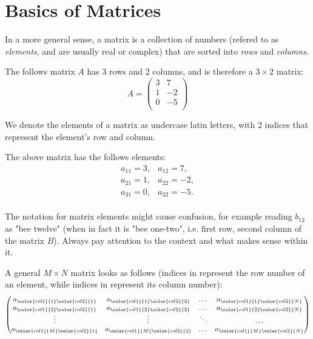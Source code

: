 \section{Basics of Matrices}
In a more general sense, a matrix is a collection of numbers (refered to as \emph{elements}, and are usually real or complex) that are sorted into \emph{rows} and \emph{columns}.
\begin{example}
  
  The follows matrix $A$ has 3 rows and 2 columns, and is therefore a $3\times2$ matrix:
  \begin{equation*}A=
	\begin{pmatrix}
	  3 & 7\\
	  1 & -2\\
	  0 & -5\\
	  \end{pmatrix}
  \end{equation*}
\end{example}

We denote the elements of a matrix as undercase latin letters, with 2 indices that represent the element's row and column.
\begin{example}
  
  The above matrix has the follows elements:
  \begin{equation*}
	\begin{array}{cc}
	  a_{11}=3, & a_{12}=7,\\
	  a_{21}=1, & a_{22}=-2,\\
	  a_{31}=0, & a_{32}=-5.\\
	\end{array}
  \end{equation*}
\end{example}

\begin{warning}
  The notation for matrix elements might cause confusion, for example reading $b_{12}$ as "bee twelve" (when in fact it is "bee one-two", i.e. first row, second column of the matrix $B$). Always pay attention to the context and what makes sense within it.
\end{warning}

A general $M\times N$ matrix looks as follows (indices in \color{col1}{red} \color{black} represent the row number of an element, while indices in \color{col2}{blue} \color{black} represent its column number):
\begin{equation*}
  \begin{pmatrix}
	a_{\color{col1}{1}\color{col2}{1}} & a_{\color{col1}{1}\color{col2}{2}} & \dots & a_{\color{col1}{1}\color{col2}{N}}\\
	a_{\color{col1}{2}\color{col2}{1}} & a_{\color{col1}{2}\color{col2}{2}} & \dots & a_{\color{col1}{2}\color{col2}{N}}\\
	\vdots & \vdots & \ddots & \dots\\
	a_{\color{col1}{M}\color{col2}{1}} & a_{\color{col1}{M}\color{col2}{2}} & \dots & a_{\color{col1}{M}\color{col2}{N}}\\
  \end{pmatrix}
\end{equation*}

